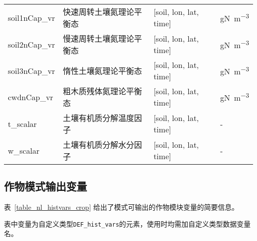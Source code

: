 {\begin{longtable}[htbp]{lp{}ll}
soil1nCap\_vr & 快速周转土壤氮理论平衡态 & {[}soil, lon, lat, time{]}  & \unit{gN.m^{-3}} \\
soil2nCap\_vr & 慢速周转土壤氮理论平衡态 & {[}soil, lon, lat, time{]}  & \unit{gN.m^{-3}} \\
soil3nCap\_vr & 惰性土壤氮理论平衡态 & {[}soil, lon, lat, time{]}  & \unit{gN.m^{-3}} \\
cwdnCap\_vr & 粗木质残体氮理论平衡态 & {[}soil, lon, lat, time{]}  & \unit{gN.m^{-3}} \\
t\_scalar & 土壤有机质分解温度因子 & {[}soil, lon, lat, time{]}  & - \\
w\_scalar & 土壤有机质分解水分因子 & {[}soil, lon, lat, time{]}  & - \\
\end{longtable}}

\subsection{作物模式输出变量}\label{sec_hist_vars_crop}

表~\ref{table_nl_histvars_crop} 给出了模式可输出的作物模块变量的简要信息。\par
表中变量为自定义类型\texttt{DEF\_hist\_vars}的元素，使用时均需加自定义类型数据变量名。

